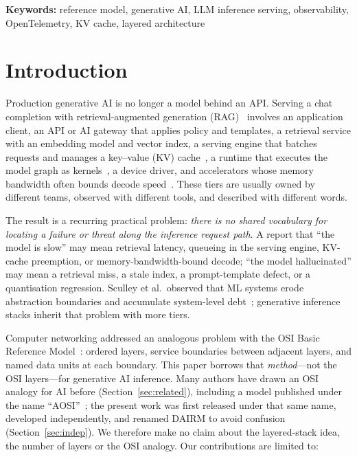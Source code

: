 \documentclass[11pt]{article}
\begin{document}
\noindent\textbf{Keywords:} reference model, generative AI, LLM inference serving, observability, OpenTelemetry, KV cache, layered architecture

\section{Introduction}
\label{sec:intro}

Production generative AI is no longer a model behind an API. Serving a chat completion with retrieval-augmented generation (RAG)~\cite{lewis2020rag} involves an application client, an API or AI gateway that applies policy and templates, a retrieval service with an embedding model and vector index, a serving engine that batches requests and manages a key--value (KV) cache~\cite{yu2022orca,kwon2023paged}, a runtime that executes the model graph as kernels~\cite{dao2022flash}, a device driver, and accelerators whose memory bandwidth often bounds decode speed~\cite{williams2009roofline,yuan2024roofline}. These tiers are usually owned by different teams, observed with different tools, and described with different words.

The result is a recurring practical problem: \emph{there is no shared vocabulary for locating a failure or threat along the inference request path}. A report that ``the model is slow'' may mean retrieval latency, queueing in the serving engine, KV-cache preemption, or memory-bandwidth-bound decode; ``the model hallucinated'' may mean a retrieval miss, a stale index, a prompt-template defect, or a quantisation regression. Sculley et al.\ observed that ML systems erode abstraction boundaries and accumulate system-level debt~\cite{sculley2015debt}; generative inference stacks inherit that problem with more tiers.

Computer networking addressed an analogous problem with the OSI Basic Reference Model~\cite{iso7498,itux200,zimmermann1980osi}: ordered layers, service boundaries between adjacent layers, and named data units at each boundary. This paper borrows that \emph{method}---not the OSI layers---for generative AI inference. Many authors have drawn an OSI analogy for AI before (Section~\ref{sec:related}), including a model published under the name ``AOSI''~\cite{reilly2025aosi}; the present work was first released under that same name, developed independently, and renamed DAIRM to avoid confusion (Section~\ref{sec:indep}). We therefore make no claim about the layered-stack idea, the number of layers or the OSI analogy. Our contributions are limited to:
\end{document}
